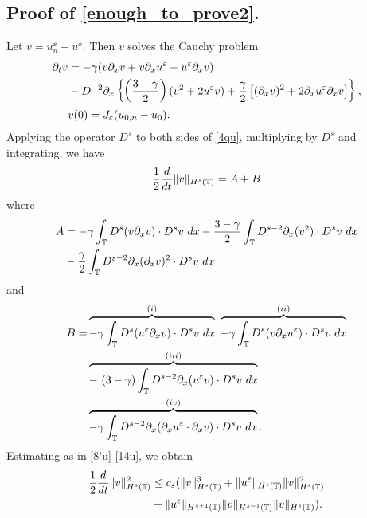 \subsection{ Proof of \eqref{enough_to_prove2}.} 
Let $v = u^\ee_n - u^\ee$. Then $v$ solves the Cauchy problem
\begin{align}
		\label{4qu}
		\partial_t v 
		& =  -\gamma (v \partial_x v + v \partial_x u^\varepsilon + u^\varepsilon \partial_x v)  
		\\
		& - D^{-2} \partial_x \left\{ \left (\frac{3-\gamma}{2} \right )(v^2 +
		2u^\varepsilon v) + \frac{\gamma}{2}\left[ (\partial_x v)^2 + 2 \partial_x u^\varepsilon \partial_x v \right]
		\right\}, \notag
		\\
		& v(0) =J_\varepsilon(u_{0,n} - u_0).
		\label{5qu}
	\end{align}
Applying the operator $D^s$ to both sides of \eqref{4qu}, multiplying by
	$D^s$ and integrating, we have
	\begin{equation}
		\begin{split}
			\frac{1}{2}\frac{d}{dt} \|v\|_{H^s(\mathbb{T})} = A + B
			\label{6qu}
		\end{split}
	\end{equation}
	where
	\begin{equation}
		\begin{split}
			A
			& =  -\gamma \int_{\mathbb{T}} D^s(v \partial_x v) \cdot D^s v \
			dx
			- \frac{3- \gamma}{2} \int_{\mathbb{T}} D^{s-2} \partial_x (v^2) \cdot D^s v
			\ dx
			\\
			& - \frac{\gamma}{2}\int_{\mathbb{T}} D^{s-2} \partial_x (\partial_x v)^2 \cdot D^s
			v \ dx
			\label{7qu}
		\end{split}
	\end{equation}
	and
	\begin{equation}
		\begin{split}
			B 
			 = &  \overbrace{-\gamma \int_{\mathbb{T}} D^s (u^\varepsilon \partial_x v) \cdot D^s v \
			 dx}^{(i)}
			 \ \overbrace{-\gamma \int_{\mathbb{T}} D^s (v \partial_x u^\varepsilon ) \cdot D^s v \
			 dx}^{(ii)}
			 \\
			  & \overbrace{- \ ( 3- \gamma) \int_{\mathbb{T}} D^{s-2} \partial_x (u^\varepsilon v) \cdot D^s
			 v \ dx}^{(iii)}
			 \\
			 & \overbrace{-\gamma \int_{\mathbb{T}} D^{s-2} \partial_x
			(\partial_x u^\varepsilon \cdot \partial_x v) \cdot D^s v \
			dx}^{(iv)}.
			\label{8qu}
		\end{split}
	\end{equation}
	Estimating as in \eqref{8'u}-\eqref{14u}, we obtain
	\begin{equation}
		\begin{split}
			\frac{1}{2}\frac{d}{dt}\|v\|_{H^{s}(\mathbb{T})}^2
			& \le c_s(\|v\|_{H^s(\mathbb{T})}^3 + \|u^\varepsilon\|_{H^s(\mathbb{T})}
			\|v\|_{H^s(\mathbb{T})}^2
			\\
			& + \|u^\varepsilon\|_{H^{s+1}(\mathbb{T})}
			\|v\|_{H^{s-1}(\mathbb{T})} \|v\|_{H^s(\mathbb{T})}).
			\label{15qu}
		\end{split}
	\end{equation}
